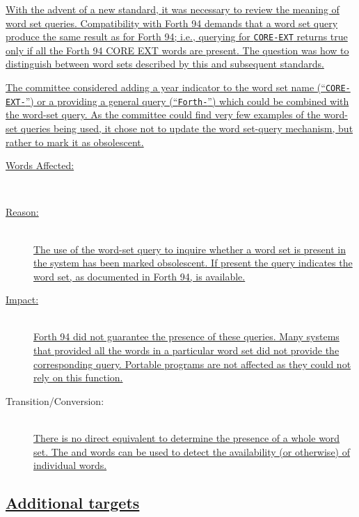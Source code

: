 \uline{With the advent of a new standard, it was necessary to review the meaning
of word set queries.  Compatibility with Forth 94 demands that a word set
query produce the same result as for Forth 94; i.e., querying for
\texttt{CORE-EXT} returns true only if all the Forth 94 CORE EXT words
are present.  The question was how to distinguish between word sets
described by this and subsequent standards.}

\uline{The committee considered adding a year indicator to the word set name
(``\texttt{CORE-EXT-\snapshot}'') or a providing a general query
(``\texttt{Forth-\snapshot}'') which could be combined with the
word-set query.  As the committee could find very few examples of the
word-set queries being used, it chose not to update the word set-query
mechanism, but rather to mark it as obsolescent.}

\begin{description}
\item[\uline{Words Affected:}] ~\\
	\uline{}

\item[\uline{Reason:}] ~\\
	\uline{The use of the word-set query to inquire whether a word set is
	present in the system has been marked obsolescent.  If present the
	query indicates the word set, as documented in Forth 94, is available.}

\item[\uline{Impact:}] ~\\
	\uline{Forth 94 did not guarantee the presence of these queries.  Many
	systems that provided all the words in a particular word set did not
	provide the corresponding query.  Portable programs are not affected
	as they could not rely on this function.}

\item[Transition/Conversion:] ~\\
	\uline{There is no direct equivalent to determine the presence of a whole
	word set.  The  and 
	words can be used to detect the availability (or otherwise) of individual
	words.}
\end{description}

\subsection[Additional \word{TO} targets]{\uline{Additional  targets}} %
\label{diff:12:to}


